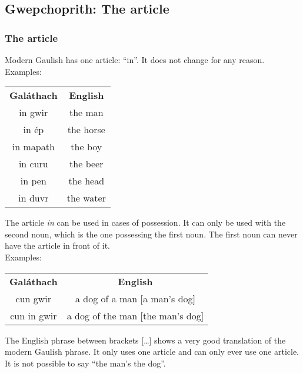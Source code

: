 \subsection{Gwepchoprith: The article}
\subsubsection{The article}

Modern Gaulish has one article: ``in''. It does not change for any reason.\\
Examples:
\begin{table}[H]
\centering
\begin{tabular}{cc}
  \toprule
  \textbf{Gal\'{a}thach} & \textbf{English}\\
  \cmidrule(lr){1-1}\cmidrule(lr){2-2}
  in gwir & the man\\
  in \'{e}p & the horse\\
  in mapath & the boy\\
  in curu & the beer\\
  in pen & the head\\
  in duvr & the water\\
  \bottomrule
\end{tabular}
\label{examples_possession_particle_when_using_noun}
\end{table}

The article \textit{in} can be used in cases of possession. It can only be used with the second noun, which is the one possessing the first noun. The first noun can never have the article in front of it.\\
Examples:
\begin{table}[H]
\centering
\begin{tabular}{cc}
  \toprule
  \textbf{Gal\'{a}thach} & \textbf{English}\\
  \cmidrule(lr){1-1}\cmidrule(lr){2-2}
  cun gwir & a dog of a man $[$a man's dog$]$\\
  cun in gwir & a dog of the man $[$the man's dog$]$\\
  \bottomrule
\end{tabular}
\label{examples_possession_first_noun_no_particle_in_front}
\end{table}

The English phrase between brackets [\dots] shows a very good translation of the modern Gaulish phrase. It only uses one article and can only ever use one article. It is not possible to say ``the man's the dog''.\\

